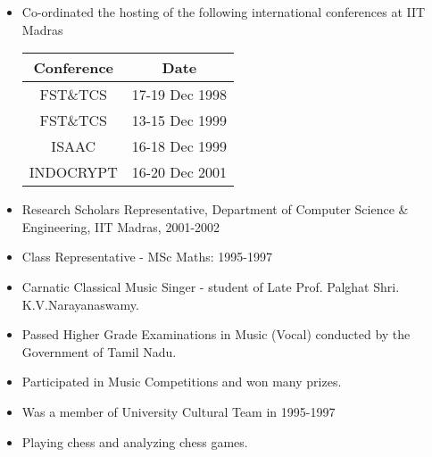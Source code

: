 \documentclass[11pt]{article}
\begin{document}

\vspace{0.1cm}

\begin{itemize}
\item Co-ordinated the hosting of the following international
conferences at IIT Madras

\vspace{0.1cm}

\begin{center}
\begin{tabular}{|c|c|}\hline
Conference & Date \\ \hline
FST\&TCS & 17-19 Dec 1998\\
FST\&TCS & 13-15 Dec 1999\\
ISAAC & 16-18 Dec 1999\\
INDOCRYPT & 16-20 Dec 2001\\ \hline
\end{tabular}
\end{center}

\vspace{0.1cm}
\item Research Scholars Representative, Department of Computer Science
\& Engineering, IIT Madras, 2001-2002
\item Class Representative - MSc Maths: 1995-1997

\end{itemize}

\vspace{0.1cm}


\vspace{0.1cm}

\begin{itemize}
\item Carnatic Classical Music Singer - student of Late Prof. Palghat Shri. K.V.Narayanaswamy. 
\item Passed Higher Grade Examinations in Music (Vocal) conducted by the Government of Tamil Nadu. 
\item Participated in Music Competitions and won many prizes. 
\item Was a member of University Cultural Team in 1995-1997
\item Playing chess and analyzing chess games.
\end{itemize}
\end{document}
